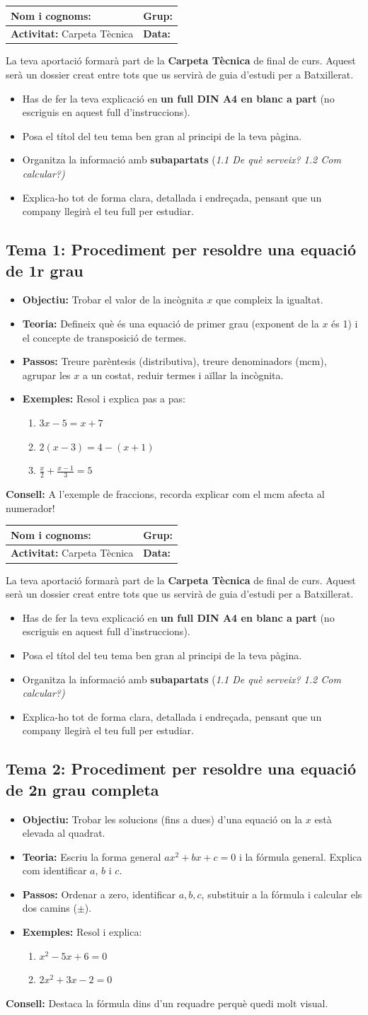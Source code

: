 \documentclass[12pt,a4paper]{article}
\newcommand{\introcomuna}{
    \begin{tcolorbox}[colback=gray!5,colframe=gray!50!black,title=\textbf{La Carpeta Tècnica de Matemàtiques}]
    La teva aportació formarà part de la \textbf{Carpeta Tècnica} de final de curs. Aquest serà un dossier creat entre tots que us servirà de guia d'estudi per a Batxillerat.
    
    \begin{itemize}[label=\textbullet, leftmargin=*]
        \item Has de fer la teva explicació en \textbf{un full DIN A4 en blanc a part} (no escriguis en aquest full d'instruccions).
        \item Posa el títol del teu tema ben gran al principi de la teva pàgina.
        \item Organitza la informació amb \textbf{subapartats} (\textit{1.1 De què serveix? 1.2 Com calcular?)}
        \item Explica-ho tot de forma clara, detallada i endreçada, pensant que un company llegirà el teu full per estudiar.
    \end{itemize}
    \end{tcolorbox}
    \vspace{0.1cm}
}
\newcommand{\capcaleraalumne}[1]{
    \begingroup
    \renewcommand{\arraystretch}{2.2}
    \begin{tabularx}{\textwidth}{|X|p{4cm}|}
    \hline
    \textbf{Nom i cognoms:} & \textbf{Grup:} \\ \hline
    \textbf{Activitat:} Carpeta Tècnica & \textbf{Data:} \\ \hline
    \end{tabularx}
    \endgroup
    \vspace{0.4cm}
}
\begin{document}
\capcaleraalumne{1}
\introcomuna
\subsection*{Tema 1: Procediment per resoldre una equació de 1r grau}
\begin{itemize}[label=\textbullet]
    \item \textbf{Objectiu:} Trobar el valor de la incògnita $x$ que compleix la igualtat.
    \item \textbf{Teoria:} Defineix què és una equació de primer grau (exponent de la $x$ és 1) i el concepte de transposició de termes.
    \item \textbf{Passos:} Treure parèntesis (distributiva), treure denominadors (mcm), agrupar les $x$ a un costat, reduir termes i aïllar la incògnita.
    \item \textbf{Exemples:} Resol i explica pas a pas:
    \begin{enumerate}[label=\alph*)]
        \item $3x - 5 = x + 7$
        \item $2(x - 3) = 4 - (x + 1)$
        \item $\displaystyle \frac{x}{2} + \frac{x-1}{3} = 5$
    \end{enumerate}
\end{itemize}
\vfill
\noindent\textbf{Consell:} A l'exemple de fraccions, recorda explicar com el mcm afecta al numerador!

\newpage
\capcaleraalumne{2}
\introcomuna
\subsection*{Tema 2: Procediment per resoldre una equació de 2n grau completa}
\begin{itemize}[label=\textbullet]
    \item \textbf{Objectiu:} Trobar les solucions (fins a dues) d'una equació on la $x$ està elevada al quadrat.
    \item \textbf{Teoria:} Escriu la forma general $ax^2 + bx + c = 0$ i la fórmula general. Explica com identificar $a$, $b$ i $c$.
    \item \textbf{Passos:} Ordenar a zero, identificar $a, b, c$, substituir a la fórmula i calcular els dos camins ($\pm$).
    \item \textbf{Exemples:} Resol i explica:
    \begin{enumerate}[label=\alph*)]
        \item $x^2 - 5x + 6 = 0$
        \item $2x^2 + 3x - 2 = 0$
    \end{enumerate}
\end{itemize}
\vfill
\noindent\textbf{Consell:} Destaca la fórmula dins d'un requadre perquè quedi molt visual.
\end{document}
